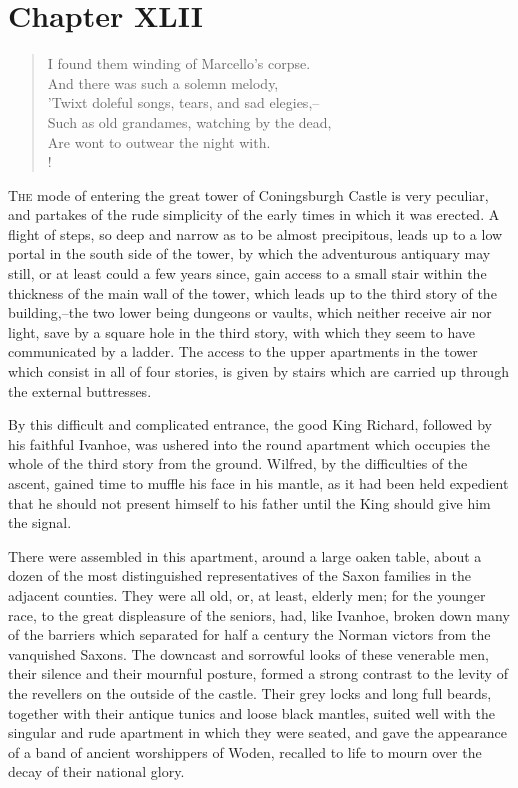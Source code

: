 \chapter{Chapter XLII}

\begin{verse}
I found them winding of Marcello's corpse.\\
And there was such a solemn melody,\\
'Twixt doleful songs, tears, and sad elegies,--\\
Such as old grandames, watching by the dead,\\
Are wont to outwear the night with.\\!
\end{verse}

\lettrine{T}{he} mode of entering the great tower of Coningsburgh Castle
is very
peculiar, and partakes of the rude simplicity of the early times in
which it was erected. A flight of steps, so deep and narrow as to be
almost precipitous, leads up to a low portal in the south side of the
tower, by which the adventurous antiquary may still, or at least could a
few years since, gain access to a small stair within the thickness of
the main wall of the tower, which leads up to the third story of the
building,--the two lower being dungeons or vaults, which neither receive
air nor light, save by a square hole in the third story, with which they
seem to have communicated by a ladder. The access to the upper
apartments in the tower which consist in all of four stories, is given
by stairs which are carried up through the external buttresses.

By this difficult and complicated entrance, the good King Richard,
followed by his faithful Ivanhoe, was ushered into the round apartment
which occupies the whole of the third story from the ground. Wilfred, by
the difficulties of the ascent, gained time to muffle his face in his
mantle, as it had been held expedient that he should not present himself
to his father until the King should give him the signal.

There were assembled in this apartment, around a large oaken table,
about a dozen of the most distinguished representatives of the Saxon
families in the adjacent counties. They were all old, or, at least,
elderly men; for the younger race, to the great displeasure of the
seniors, had, like Ivanhoe, broken down many of the barriers which
separated for half a century the Norman victors from the vanquished
Saxons. The downcast and sorrowful looks of these venerable men, their
silence and their mournful posture, formed a strong contrast to the
levity of the revellers on the outside of the castle. Their grey locks
and long full beards, together with their antique tunics and loose black
mantles, suited well with the singular and rude apartment in which they
were seated, and gave the appearance of a band of ancient worshippers of
Woden, recalled to life to mourn over the decay of their national glory.

